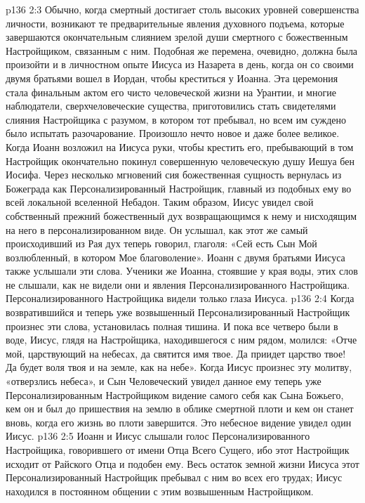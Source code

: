 \vs p136 2:3 Обычно, когда смертный достигает столь высоких уровней совершенства личности, возникают те предварительные явления духовного подъема, которые завершаются окончательным слиянием зрелой души смертного с божественным Настройщиком, связанным с ним. Подобная же перемена, очевидно, должна была произойти и в личностном опыте Иисуса из Назарета в день, когда он со своими двумя братьями вошел в Иордан, чтобы креститься у Иоанна. Эта церемония стала финальным актом его чисто человеческой жизни на Урантии, и многие наблюдатели, сверхчеловеческие существа, приготовились стать свидетелями слияния Настройщика с разумом, в котором тот пребывал, но всем им суждено было испытать разочарование. Произошло нечто новое и даже более великое. Когда Иоанн возложил на Иисуса руки, чтобы крестить его, пребывающий в том Настройщик окончательно покинул совершенную человеческую душу Иешуа бен Иосифа. Через несколько мгновений сия божественная сущность вернулась из Божеграда как Персонализированный Настройщик, главный из подобных ему во всей локальной вселенной Небадон. Таким образом, Иисус увидел свой собственный прежний божественный дух возвращающимся к нему и нисходящим на него в персонализированном виде. Он услышал, как этот же самый происходивший из Рая дух теперь говорил, глаголя: «Сей есть Сын Мой возлюбленный, в котором Мое благоволение». Иоанн с двумя братьями Иисуса также услышали эти слова. Ученики же Иоанна, стоявшие у края воды, этих слов не слышали, как не видели они и явления Персонализированного Настройщика. Персонализированного Настройщика видели только глаза Иисуса.
\vs p136 2:4 \pc Когда возвратившийся и теперь уже возвышенный Персонализированный Настройщик произнес эти слова, установилась полная тишина. И пока все четверо были в воде, Иисус, глядя на Настройщика, находившегося с ним рядом, молился: «Отче мой, царствующий на небесах, да святится имя твое. Да приидет царство твое! Да будет воля твоя и на земле, как на небе». Когда Иисус произнес эту молитву, «отверзлись небеса», и Сын Человеческий увидел данное ему теперь уже Персонализированным Настройщиком видение самого себя как Сына Божьего, кем он и был до пришествия на землю в облике смертной плоти и кем он станет вновь, когда его жизнь во плоти завершится. Это небесное видение увидел один Иисус.
\vs p136 2:5 Иоанн и Иисус слышали голос Персонализированного Настройщика, говорившего от имени Отца Всего Сущего, ибо этот Настройщик исходит от Райского Отца и подобен ему. Весь остаток земной жизни Иисуса этот Персонализированный Настройщик пребывал с ним во всех его трудах; Иисус находился в постоянном общении с этим возвышенным Настройщиком.

